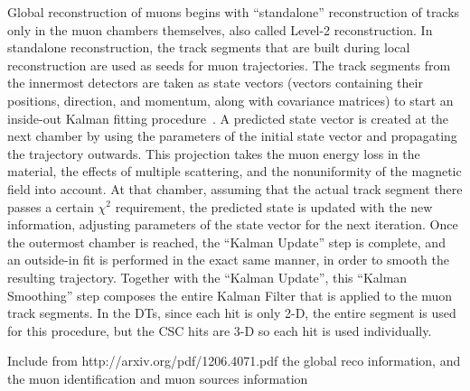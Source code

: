 Global reconstruction of muons begins with ``standalone'' reconstruction of tracks only in the muon chambers themselves, also called Level-2 reconstruction.  In standalone reconstruction, the track segments that are built during local reconstruction are used as seeds for muon trajectories.  The track segments from the innermost detectors are taken as state vectors (vectors containing their positions, direction, and momentum, along with covariance matrices) to start an inside-out Kalman fitting procedure~\cite{CMStdr,Kalman_Comb3}.  A predicted state vector is created at the next chamber by using the parameters of the initial state vector and propagating the trajectory outwards.  This projection takes the muon energy loss in the material, the effects of multiple scattering, and the nonuniformity of the magnetic field into account.  At that chamber, assuming that the actual track segment there passes a certain $\chi^2$ requirement, the predicted state is updated with the new information, adjusting parameters of the state vector for the next iteration.  Once the outermost chamber is reached, the ``Kalman Update'' step is complete, and an outside-in fit is performed in the exact same manner, in order to smooth the resulting trajectory.  Together with the ``Kalman Update'', this ``Kalman Smoothing'' step composes the entire Kalman Filter that is applied to the muon track segments.  In the DTs, since each hit is only 2-D, the entire segment is used for this procedure, but the CSC hits are 3-D so each hit is used individually.

Include from http://arxiv.org/pdf/1206.4071.pdf the global reco information, and the muon identification and muon sources information


